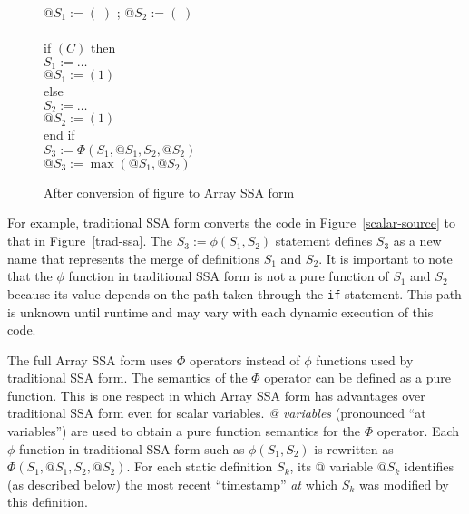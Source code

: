 \begin{figure}%
\begin{center}
\parbox{3.0in}{
\begin{programa}
\Ta $@S_1 := (\;)$ ;  $@S_2 := (\;)$\\
\\
\Ta  if $(C)$ then \\
\Tb   $S_1 := \ldots$ \\
\Tb   $@S_1 := (1)$ \\
\Ta  else  \\
\Tb   $S_2 := \ldots$ \\
\Tb   $@S_2 := (1)$ \\
\Ta  end if \\
\Ta  $S_3 := \Phi (S_1,@S_1,S_2,@S_2)$\\
\Ta  $@S_3 := \max(@S_1, @S_2)$
\end{programa}
}
\end{center}
\caption{After conversion of figure \protect{\ref{scalar-source}} to Array SSA form}
\label{our-phi}
\end{figure}

For example, traditional
SSA form converts the code in Figure~\ref{scalar-source}
to that in Figure~\ref{trad-ssa}.  The $S_3 := \phi (S_1,S_2)$ statement
defines $S_3$ as a new name that represents the merge of definitions
$S_1$ and $S_2$.  It is important
to note that the $\phi$ function in traditional SSA form
is not a pure function of $S_1$ and $S_2$ because its value
depends on the path taken through the {\tt if} statement. 
This path is unknown until runtime and may vary with each dynamic execution
of this code.  

The full Array SSA form uses $\Phi$ operators instead of $\phi$
functions used by traditional SSA form. The semantics of the $\Phi$
operator can be defined as a pure function.  
This is one respect in which Array SSA form
has
advantages over traditional SSA form even for scalar variables.
{\it @ variables} (pronounced ``at variables'')
are used to obtain a pure function semantics for the
$\Phi$
operator. Each
$\phi$ function in traditional SSA form such as $\phi(S_1,S_2)$ is
rewritten as $\Phi(S_1,@S_1,S_2,@S_2)$.  For each static definition
$S_k$, its @ variable $@S_k$ identifies (as described below)
the most recent ``timestamp'' {\it
at} which $S_k$ was modified by this definition.

